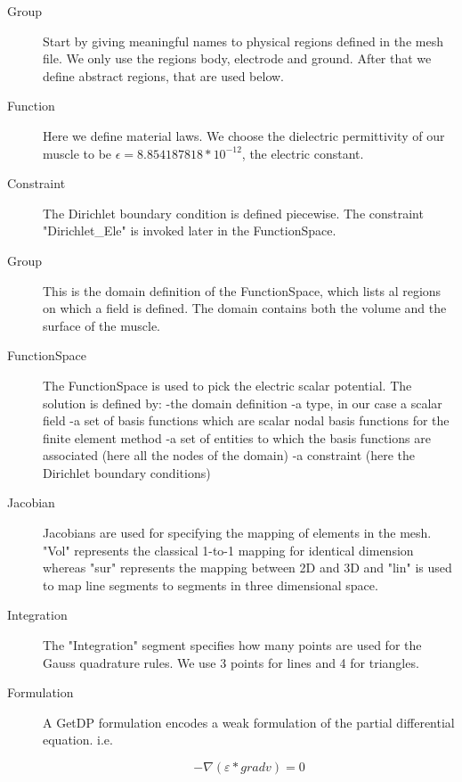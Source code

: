 \documentclass[preprint,journal]{vgtc}       %
\begin{document}
\begin{description}
	\item[Group]
	Start by giving meaningful names to physical regions defined in the mesh file.
	We only use the regions body, electrode and ground. 
	After that we define abstract regions, that are used below.
	\item[Function]
	Here we define material laws.
	We choose the dielectric permittivity of our muscle to be $\epsilon = 8.854187818 *10^{-12}$, the electric constant.
	\item[Constraint]
	The Dirichlet boundary condition is defined piecewise. 
	The constraint "Dirichlet\_Ele" is invoked later in the FunctionSpace.
	\item[Group]
	This is the domain definition of the FunctionSpace, which lists al regions on which a field is defined. 
	The domain contains both the volume and the surface of the muscle.
	\item[FunctionSpace]
	The FunctionSpace is used to pick the electric scalar potential. 
	The solution is defined  by:\newline
	-the domain definition\newline
	-a type, in our case a scalar field\newline
	-a set of basis functions which are scalar nodal basis functions for the finite element method\newline 
	-a set of entities to which the basis functions are associated (here all the nodes of the domain)\newline
	-a constraint (here the Dirichlet boundary conditions)
	
	\item[Jacobian] 
	Jacobians are used for specifying the mapping of elements in the mesh.
	"Vol" represents the classical 1-to-1 mapping for identical dimension whereas "sur" represents the mapping between 2D and 3D and "lin" is used to map line segments to segments in three dimensional space.
	
	\item[Integration]
	The "Integration" segment specifies how many points are used for the Gauss quadrature rules. 
	We use 3 points for lines and 4 for triangles.
	
	\item[Formulation]
	A GetDP formulation encodes a weak formulation of the partial differential equation. i.e. 
	
	
	\[-\nabla (\varepsilon *\mathrel{grad} v) = 0\]
	

\end{description}
\end{document}
